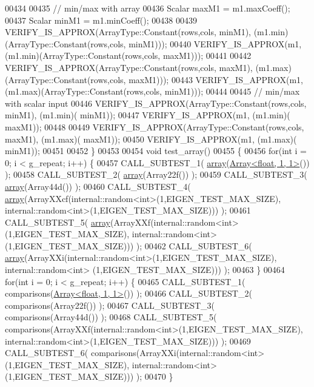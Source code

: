 \begin{DoxyCode}
00434 
00435   \textcolor{comment}{// min/max with array}
00436   Scalar maxM1 = m1.maxCoeff();
00437   Scalar minM1 = m1.minCoeff();
00438 
00439   VERIFY\_IS\_APPROX(ArrayType::Constant(rows,cols, minM1), (m1.min)(ArrayType::Constant(rows,cols, minM1)));
00440   VERIFY\_IS\_APPROX(m1, (m1.min)(ArrayType::Constant(rows,cols, maxM1)));
00441 
00442   VERIFY\_IS\_APPROX(ArrayType::Constant(rows,cols, maxM1), (m1.max)(ArrayType::Constant(rows,cols, maxM1)));
00443   VERIFY\_IS\_APPROX(m1, (m1.max)(ArrayType::Constant(rows,cols, minM1)));
00444 
00445   \textcolor{comment}{// min/max with scalar input}
00446   VERIFY\_IS\_APPROX(ArrayType::Constant(rows,cols, minM1), (m1.min)( minM1));
00447   VERIFY\_IS\_APPROX(m1, (m1.min)( maxM1));
00448 
00449   VERIFY\_IS\_APPROX(ArrayType::Constant(rows,cols, maxM1), (m1.max)( maxM1));
00450   VERIFY\_IS\_APPROX(m1, (m1.max)( minM1));
00451 
00452 \}
00453 
00454 \textcolor{keywordtype}{void} test\_array()
00455 \{
00456   \textcolor{keywordflow}{for}(\textcolor{keywordtype}{int} i = 0; i < g\_repeat; i++) \{
00457     CALL\_SUBTEST\_1( \hyperlink{class_eigen_1_1array}{array}(\hyperlink{group___core___module_class_eigen_1_1_array}{Array<float, 1, 1>}()) );
00458     CALL\_SUBTEST\_2( \hyperlink{class_eigen_1_1array}{array}(Array22f()) );
00459     CALL\_SUBTEST\_3( \hyperlink{class_eigen_1_1array}{array}(Array44d()) );
00460     CALL\_SUBTEST\_4( \hyperlink{class_eigen_1_1array}{array}(ArrayXXcf(internal::random<int>(1,EIGEN\_TEST\_MAX\_SIZE), 
      internal::random<int>(1,EIGEN\_TEST\_MAX\_SIZE))) );
00461     CALL\_SUBTEST\_5( \hyperlink{class_eigen_1_1array}{array}(ArrayXXf(internal::random<int>(1,EIGEN\_TEST\_MAX\_SIZE), internal::random<int>
      (1,EIGEN\_TEST\_MAX\_SIZE))) );
00462     CALL\_SUBTEST\_6( \hyperlink{class_eigen_1_1array}{array}(ArrayXXi(internal::random<int>(1,EIGEN\_TEST\_MAX\_SIZE), internal::random<int>
      (1,EIGEN\_TEST\_MAX\_SIZE))) );
00463   \}
00464   \textcolor{keywordflow}{for}(\textcolor{keywordtype}{int} i = 0; i < g\_repeat; i++) \{
00465     CALL\_SUBTEST\_1( comparisons(\hyperlink{group___core___module_class_eigen_1_1_array}{Array<float, 1, 1>}()) );
00466     CALL\_SUBTEST\_2( comparisons(Array22f()) );
00467     CALL\_SUBTEST\_3( comparisons(Array44d()) );
00468     CALL\_SUBTEST\_5( comparisons(ArrayXXf(internal::random<int>(1,EIGEN\_TEST\_MAX\_SIZE), 
      internal::random<int>(1,EIGEN\_TEST\_MAX\_SIZE))) );
00469     CALL\_SUBTEST\_6( comparisons(ArrayXXi(internal::random<int>(1,EIGEN\_TEST\_MAX\_SIZE), 
      internal::random<int>(1,EIGEN\_TEST\_MAX\_SIZE))) );
00470   \}

\end{DoxyCode}
